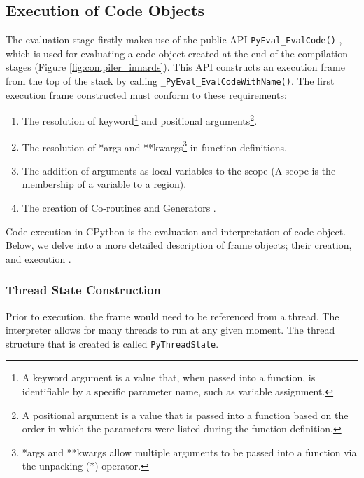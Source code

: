 {		\subsection{Execution of Code Objects}
		The evaluation stage firstly makes use of the public API \lstinline|PyEval_EvalCode()| \cite[lines 716--724]{ceval2022github}, which is used for evaluating a code object created 
		at the end of the compilation stages (Figure \ref{fig:compiler_innards}). This API constructs an execution frame from the top of the stack by calling \lstinline|_PyEval_EvalCodeWithName()|.
		The first execution frame constructed must conform to these requirements:
		\begin{enumerate}
			\item The resolution of keyword\footnote{A keyword argument is a value that, when passed into a function, is identifiable by a specific parameter name, such as variable assignment.} 
			and positional arguments\footnote{A positional argument is a value that is passed into a function based on the order in which the parameters were listed during the function definition.}.
			\item The resolution of *args and **kwargs\footnote{\label{footnote:kwargs_args}*args and **kwargs allow multiple arguments to be passed into a function via the unpacking (*) operator.} 
			in function definitions.
			\item The addition of arguments as local variables to the scope (A scope is the membership of a variable to a region).
			\item The creation of Co-routines and Generators \cite[pp.2--3]{tismer2000continuations}.
		\end{enumerate} 
		Code execution in CPython is the evaluation and interpretation of code object. Below, we delve into a more detailed description of frame objects; their creation, and execution \cite[]{real2022python}.
		
			\subsubsection*{Thread State Construction}
			\par Prior to execution, the frame would need to be referenced from a thread. The interpreter allows for many threads to run at any given moment. The thread structure that is created is called 
			\lstinline|PyThreadState|.
			
}
